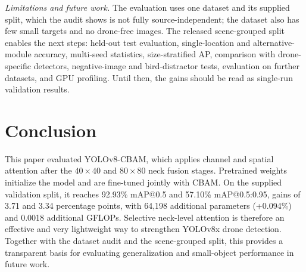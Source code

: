 \documentclass[conference]{IEEEtran}
\begin{document}
\textit{Limitations and future work.} The evaluation uses one dataset and its supplied split, which the audit shows is not fully source-independent; the dataset also has few small targets and no drone-free images. The released scene-grouped split enables the next steps: held-out test evaluation, single-location and alternative-module accuracy, multi-seed statistics, size-stratified AP, comparison with drone-specific detectors, negative-image and bird-distractor tests, evaluation on further datasets, and GPU profiling. Until then, the gains should be read as single-run validation results.

\section{Conclusion}

This paper evaluated YOLOv8-CBAM, which applies channel and spatial attention after the $40\times40$ and $80\times80$ neck fusion stages. Pretrained weights initialize the model and are fine-tuned jointly with CBAM. On the supplied validation split, it reaches 92.93\% mAP@0.5 and 57.10\% mAP@0.5:0.95, gains of 3.71 and 3.34 percentage points, with 64,198 additional parameters (+0.094\%) and 0.0018 additional GFLOPs. Selective neck-level attention is therefore an effective and very lightweight way to strengthen YOLOv8x drone detection. Together with the dataset audit and the scene-grouped split, this provides a transparent basis for evaluating generalization and small-object performance in future work.
\end{document}
